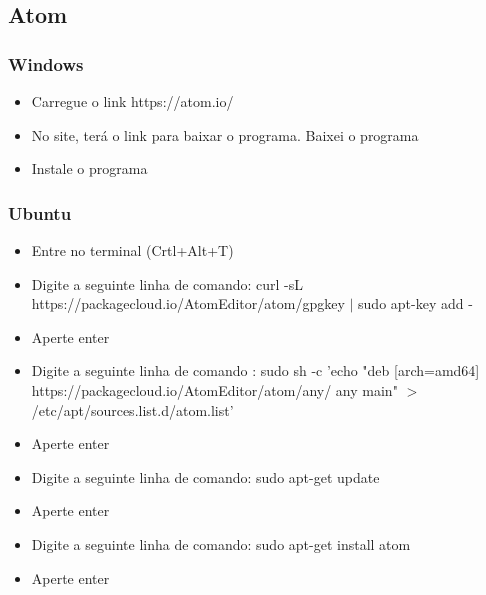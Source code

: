 \subsection{Atom}

\subsubsection{Windows}

\begin{itemize}
    \item Carregue o link https://atom.io/
    \item No site, terá o link para baixar o programa. Baixei o programa
    \item Instale o programa
\end{itemize}


\subsubsection{Ubuntu}
\begin{itemize}
    \item Entre no terminal (Crtl+Alt+T)
    \item Digite a seguinte linha de comando: curl -sL https://packagecloud.io/AtomEditor/atom/gpgkey $|$ sudo apt-key add -
    \item Aperte enter
    \item Digite a seguinte linha de comando : sudo sh -c 'echo "deb [arch=amd64] https://packagecloud.io/AtomEditor/atom/any/ any main" $>$ /etc/apt/sources.list.d/atom.list'
    \item Aperte enter
    \item Digite a seguinte linha de comando: sudo apt-get update
    \item Aperte enter
    \item Digite a seguinte linha de comando: sudo apt-get install atom
    \item Aperte enter
\end{itemize}

